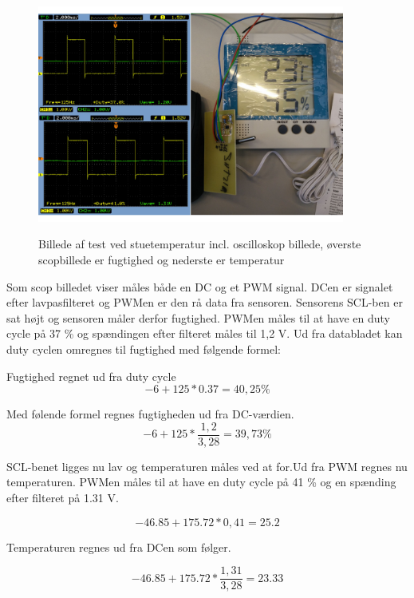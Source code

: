 \begin{figure}[h]
\centering
{\includegraphics[width=0.90\textwidth]{filer/modultest/Billeder/test_stue}}
\caption{Billede af test ved stuetemperatur incl. oscilloskop billede, øverste scopbillede er fugtighed og nederste er temperatur}
\label{lab:test_stue}
\end{figure}

Som scop billedet viser måles både en DC og et PWM signal. DCen er signalet efter lavpasfilteret og PWMen er den rå data fra sensoren. 
Sensorens SCL-ben er sat højt og sensoren måler derfor fugtighed. PWMen måles til at have en duty cycle på 37 \% og spændingen efter filteret måles til 1,2 V. Ud fra databladet kan duty cyclen omregnes til fugtighed med følgende formel:

Fugtighed regnet ud fra duty cycle
\begin{equation}
-6+125*0.37=40,25\%
\end{equation}

Med følende formel regnes fugtigheden ud fra DC-værdien.
\begin{equation}
-6+125*\frac{1,2}{3,28}= 39,73\%
\end{equation}

SCL-benet ligges nu lav og temperaturen måles ved at for.Ud fra PWM regnes nu temperaturen. PWMen måles til at have en duty cycle på 41 \% og en spænding efter filteret på 1.31 V. 

\begin{equation}
-46.85+175.72*0,41=25.2
\end{equation}

Temperaturen regnes ud fra DCen som følger. 

\begin{equation}
-46.85+175.72*\frac{1,31}{3,28}=23.33
\end{equation}


